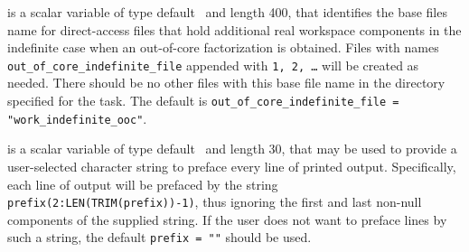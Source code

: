 \documentclass{galahad}
\begin{document}
\begin{description}
is a scalar variable of type default \character\
and length 400, that identifies the base files name for direct-access files that
hold additional real workspace components in the indefinite case when an
out-of-core factorization is obtained.
Files with names
{\tt out\_of\_core\_indefinite\_file}
appended with {\tt 1, 2, \ldots} will be created as needed.
There should be no other files with this base file name in the directory
specified for the task.
The default is
{\tt out\_of\_core\_indefinite\_file = "work\_indefinite\_ooc"}.

 is a scalar variable of type default \character\
and length 30, that may be used to provide a user-selected
character string to preface every line of printed output.
Specifically, each line of output will be prefaced by the string
{\tt prefix(2:LEN(TRIM(prefix))-1)},
thus ignoring the first and last non-null components of the
supplied string. If the user does not want to preface lines by such
a string, the default {\tt prefix = ""} should be used.

\end{description}

\end{document}
